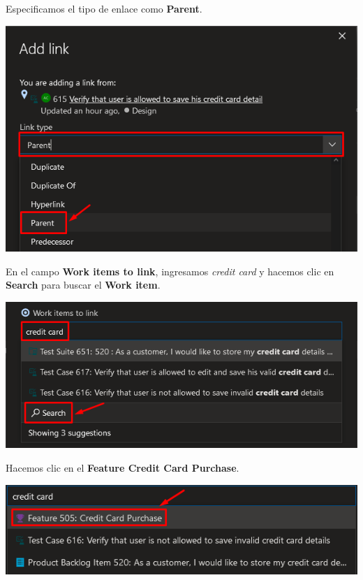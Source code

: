 \documentclass{elsarticle}
\begin{document}
Especificamos el tipo de enlace como \textbf{Parent}.
\begin{center}
	\includegraphics[width=\columnwidth]{img/Screenshot_23.png}
\end{center}

En el campo \textbf{Work items to link}, ingresamos \textit{credit card} y hacemos clic en \textbf{Search} para buscar el \textbf{Work item}.
\begin{center}
	\includegraphics[width=\columnwidth]{img/Screenshot_24.png}
\end{center}

Hacemos clic en el \textbf{Feature Credit Card Purchase}.
\begin{center}
	\includegraphics[width=\columnwidth]{img/Screenshot_25.png}
\end{center}
\end{document}
